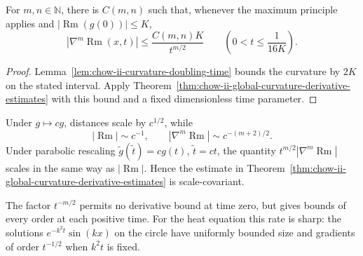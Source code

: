 \begin{corollary}
\label{cor:chow-ii-derivative-estimates-initial-curvature-bound}


For \(m,n\in\mathbb N\), there is \(C(m,n)\) such that, whenever the maximum
principle applies and \(|\operatorname{Rm}(g(0))|\le K\),
\[
|\nabla^m\operatorname{Rm}(x,t)|\le\frac{C(m,n)K}{t^{m/2}}
\qquad\left(0<t\le\frac1{16K}\right).
\]
\end{corollary}
\begin{proof}
\sketch Lemma~\ref{lem:chow-ii-curvature-doubling-time} bounds the curvature by
\(2K\) on the stated interval.  Apply
Theorem~\ref{thm:chow-ii-global-curvature-derivative-estimates} with this
bound and a fixed dimensionless time parameter.
\end{proof}

\begin{remark}
\label{rem:chow-ii-curvature-derivative-scaling}

Under \(g\mapsto cg\), distances scale by \(c^{1/2}\), while
\[
|\operatorname{Rm}|\sim c^{-1},\qquad |\nabla^m\operatorname{Rm}|\sim c^{-(m+2)/2}.
\]
Under parabolic rescaling \(\widetilde g(\widetilde t)=cg(t)\),
\(\widetilde t=ct\), the quantity
\(t^{m/2}|\nabla^m\operatorname{Rm}|\) scales in the same way as \(|\operatorname{Rm}|\).  Hence the
estimate in Theorem~\ref{thm:chow-ii-global-curvature-derivative-estimates}
is scale-covariant.
\end{remark}

\begin{remark}
\label{rem:chow-ii-derivative-estimates-smoothing}


The factor \(t^{-m/2}\) permits no derivative bound at time zero, but gives
bounds of every order at each positive time.  For the heat equation this rate
is sharp: the solutions \(e^{-k^2t}\sin(kx)\) on the circle have uniformly
bounded size and gradients of order \(t^{-1/2}\) when \(k^2t\) is fixed.
\end{remark}

